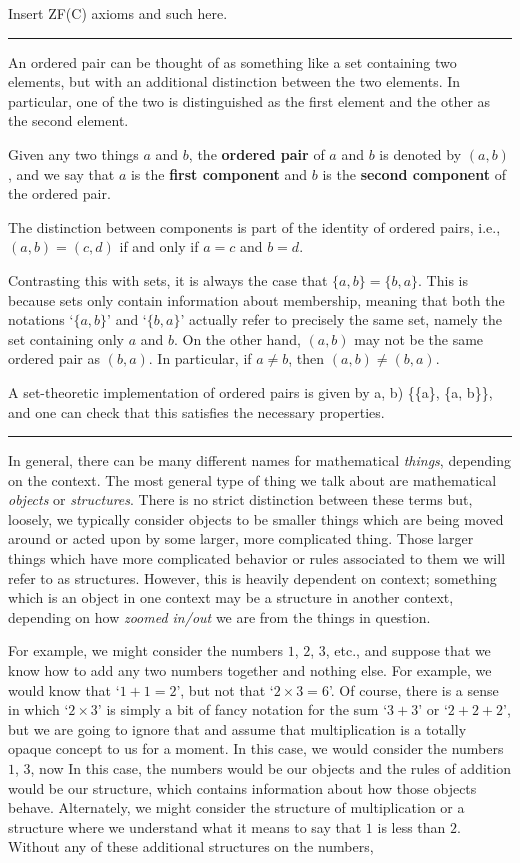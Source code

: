 \documentclass[12pt]{article}
\newcommand{\keyword}[1]{\textbf{#1}}
\def\[#1\]{\begin{align*}#1\end{align*}}
\newcommand{\sepline}{\rule{\textwidth}{0.4pt}}
\theoremstyle{definition}
\newcommand{\defeq}{\overset{\text{def}}{=}}
\newcommand{\<}{\left\langle}
\renewcommand{\>}{\right\rangle}
\begin{document}
Insert ZF(C) axioms and such here.

\sepline

An ordered pair can be thought of as something like a set containing two elements, but with an additional distinction between the two elements. In particular, one of the two is distinguished as the first element and the other as the second element.

Given any two things $a$ and $b$, the \keyword{ordered pair} of $a$ and $b$ is denoted by $(a, b)$, and we say that $a$ is the \keyword{first component} and $b$ is the \keyword{second component} of the ordered pair.

The distinction between components is part of the identity of ordered pairs, i.e., $(a, b) = (c, d)$ if and only if $a = c$ and $b = d$.

Contrasting this with sets, it is always the case that $\{a, b\} = \{b, a\}$. This is because sets only contain information about membership, meaning that both the notations `$\{a, b\}$' and `$\{b, a\}$' actually refer to precisely the same set, namely the set containing only $a$ and $b$. On the other hand, $(a, b)$ may not be the same ordered pair as $(b, a)$. In particular, if $a \ne b$, then $(a, b) \ne (b, a)$.

A set-theoretic implementation of ordered pairs is given by
\[
    (a, b) \defeq \{\{a\}, \{a, b\}\},
\]
and one can check that this satisfies the necessary properties.

\sepline


In general, there can be many different names for mathematical \emph{things}, depending on the context. The most general type of thing we talk about are mathematical \emph{objects} or \emph{structures}. There is no strict distinction between these terms but, loosely, we typically consider objects to be smaller things which are being moved around or acted upon by some larger, more complicated thing. Those larger things which have more complicated behavior or rules associated to them we will refer to as structures. However, this is heavily dependent on context; something which is an object in one context may be a structure in another context, depending on how \emph{zoomed in/out} we are from the things in question.

For example, we might consider the numbers $1$, $2$, $3$, etc., and suppose that we know how to add any two numbers together and nothing else. For example, we would know that `$1 + 1 = 2$', but not that `$2 \times 3 = 6$'. Of course, there is a sense in which `$2 \times 3$' is simply a bit of fancy notation for the sum `$3 + 3$' or `$2 + 2 + 2$', but we are going to ignore that and assume that multiplication is a totally opaque concept to us for a moment. In this case, we would consider the numbers $1$, $3$,  now In this case, the numbers would be our objects and the rules of addition would be our structure, which contains information about how those objects behave. Alternately, we might consider the structure of multiplication or a structure where we understand what it means to say that $1$ is less than $2$. Without any of these additional structures on the numbers,  
\end{document}
